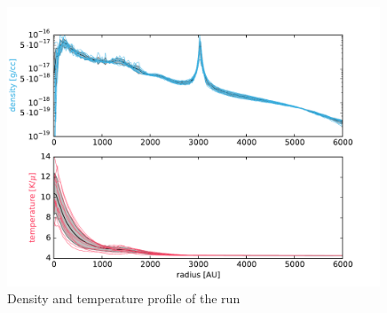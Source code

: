 \begin{figure}[!htb]
 \centering
 \includegraphics[width=0.99\textwidth]{Figures/var_rt_profiles/timeave_n100c10_6000AU}
 \captionsetup{justification=justified,singlelinecheck=false,width=\linewidth}
 \decoRule
 \caption[ profiles]{Density and temperature profile of the  run}
\label{fig:n100c10.0_profile}
\end{figure}
\FloatBarrier


